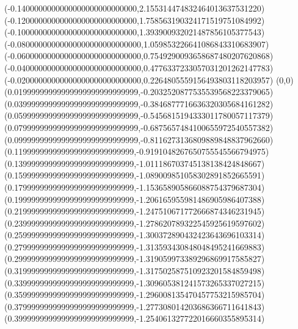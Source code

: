 \documentclass[11pt]{report}
\begin{document}
\begin{center}
  (-0.1400000000000000000000000000,2.155314474832464013637531220)
  (-0.1200000000000000000000000000,1.758563190324171519751084992)
  (-0.1000000000000000000000000000,1.393900932021487856105377543)
  (-0.08000000000000000000000000000,1.059853226641086843310683907)
  (-0.06000000000000000000000000000,0.7549290093658687480207620868)
  (-0.04000000000000000000000000000,0.4776337233057031201262147783)
  (-0.02000000000000000000000000000,0.2264805559156493803118203957)
  (0,0)
  (0.01999999999999999999999999999,-0.2032520877535539568223379065)
  (0.03999999999999999999999999999,-0.3846877716636320305684161282)
  (0.05999999999999999999999999999,-0.5456815194333011780057117379)
  (0.07999999999999999999999999999,-0.6875657484100655972540557382)
  (0.09999999999999999999999999999,-0.8116273136809889848837962660)
  (0.1199999999999999999999999999,-0.9191048267650755545566794975)
  (0.1399999999999999999999999999,-1.011186703745138138424848667)
  (0.1599999999999999999999999999,-1.089009851058302891852665591)
  (0.1799999999999999999999999999,-1.153658905866088754379687304)
  (0.1999999999999999999999999999,-1.206165955981486905986407388)
  (0.2199999999999999999999999999,-1.247510671772666874346231945)
  (0.2399999999999999999999999999,-1.278620789322545925619597602)
  (0.2599999999999999999999999999,-1.300372890432423643696103314)
  (0.2799999999999999999999999999,-1.313593430848048495241669883)
  (0.2999999999999999999999999999,-1.319059973389296869917585827)
  (0.3199999999999999999999999999,-1.317502587510923201584859498)
  (0.3399999999999999999999999999,-1.309605381241573265337027215)
  (0.3599999999999999999999999999,-1.296008135470457753215985704)
  (0.3799999999999999999999999999,-1.277308014203686366711641843)
  (0.3999999999999999999999999999,-1.254061327722016660355895314)

\end{center}
\end{document}

